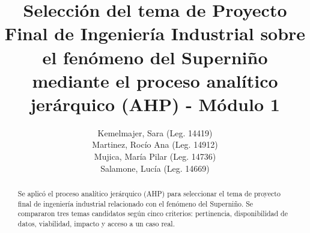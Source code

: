 \documentclass[runningheads]{llncs}
\begin{document}
%
%
\title{Selección del tema de Proyecto Final de Ingeniería Industrial sobre el fenómeno del Superniño mediante el proceso analítico jerárquico (AHP) - Módulo 1}
%
%
%
%
\author{Kemelmajer, Sara (Leg. 14419) \\
Martinez, Rocío Ana (Leg. 14912) \\
Mujica, María Pilar (Leg. 14736) \\
Salamone, Lucía (Leg. 14669) }
%
%
%
\maketitle
%
\begin{abstract}
Se aplicó el proceso analítico jerárquico (AHP) para seleccionar el tema de proyecto final de ingeniería industrial relacionado con el fenómeno del Superniño. Se compararon tres temas candidatos según cinco criterios: pertinencia, disponibilidad de datos, viabilidad, impacto y acceso a un caso real.

\end{abstract}
%
%
%
\end{document}
